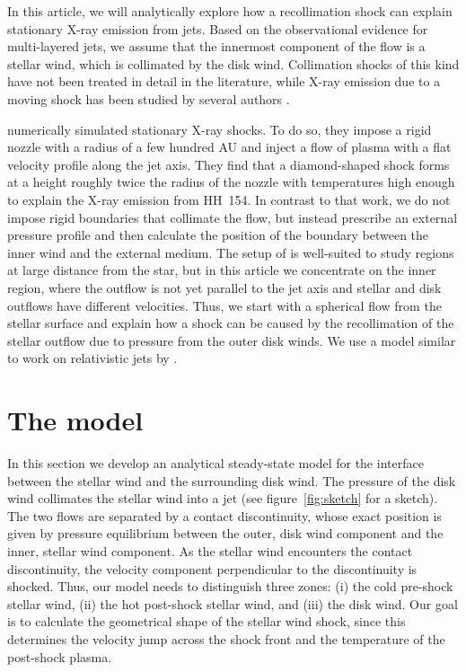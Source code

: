 \documentclass{emulateapj}
\begin{document}
In this article, we will analytically explore how a recollimation shock can explain stationary X-ray emission from jets. Based on the observational evidence for multi-layered jets, we assume that the innermost component of the flow is a stellar wind, which is collimated by the disk wind. Collimation shocks of this kind have not been treated in detail in the literature, while X-ray emission due to a moving shock has been studied by several authors \citep[see, e.g.\ the analytical work and numerical simulations by][]{2002ApJ...576L.149R,2007A&A...462..645B,2010A&A...517A..68B}.

\citet{2011ApJ...737...54B} numerically simulated stationary X-ray shocks. To do so, they impose a rigid nozzle with a radius of a few hundred AU and inject a flow of plasma with a flat velocity profile along the jet axis. They find that a diamond-shaped shock forms at a height roughly twice the radius of the nozzle with temperatures high enough to explain the X-ray emission from HH~154. In contrast to that work, we do not impose rigid boundaries that collimate the flow, but instead prescribe an external pressure profile and then calculate the position of the boundary between the inner wind and the external medium. The setup of \citet{2011ApJ...737...54B} is well-suited to study regions at large distance from the star, but in this article we concentrate on the inner region, where the outflow is not yet parallel to the jet axis and stellar and disk outflows have different velocities. Thus, we start with a spherical flow from the stellar surface and explain how a shock can be caused by the recollimation of the stellar outflow due to pressure from the outer disk winds. We use a model similar to work on relativistic jets by \citet{2012MNRAS.422.2282K}.

\section{The model}

In this section we develop an analytical steady-state model for the interface between the stellar wind and the surrounding disk wind. The pressure of the disk wind collimates the stellar wind into a jet (see figure~\ref{fig:sketch} for a sketch). The two flows are separated by a contact discontinuity, whose exact position is given by pressure equilibrium between the outer, disk wind component and the inner, stellar wind component. As the stellar wind encounters the contact discontinuity, the velocity component perpendicular to the discontinuity is shocked. Thus, our model needs to distinguish three zones: (i) the cold pre-shock stellar wind, (ii) the hot post-shock stellar wind, and (iii) the disk wind. Our goal is to calculate the geometrical shape of the stellar wind shock, since this determines the velocity jump across the shock front and the temperature of the post-shock plasma. 
\end{document}
